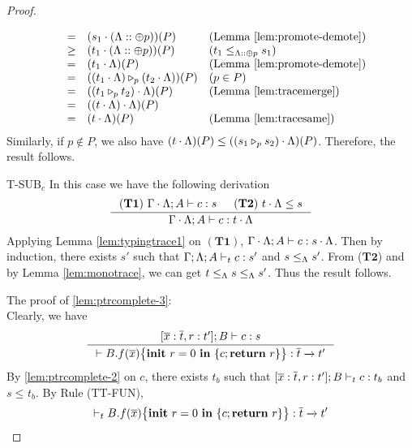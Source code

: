 {{{\begin{proof}
\begin{ProofEnumDesc}
$$\begin{array}{rlll}
&=&(s_1\cdot(\trace::\tplus{p}))(P) & (\textrm{Lemma \ref{lem:promote-demote}})\\
&\geq&(t_1\cdot(\trace::\tplus{p}))(P) & (t_1 \leq_{\trace::\tplus{p}} s_1)\\
& = & (t_1\cdot\trace)(P) &(\textrm{Lemma \ref{lem:promote-demote}})\\
& = & (\omerge{p}{(t_1\cdot\trace)}{(t_2\cdot\trace)})(P)&(p\in P)\\
& = & ((\omerge{p}{t_1}{t_2})\cdot\trace)(P)& (\textrm{Lemma \ref{lem:tracemerge}})\\
& = & ((t\cdot\trace)\cdot\trace)(P)&\\
& = & (t\cdot\trace)(P)& (\textrm{Lemma \ref{lem:tracesame}})\\
\end{array}
$$
Similarly, if $p\notin P$, we also have $(t \cdot \trace)(P)\leq ((\omerge{p}{s_1}{s_2})\cdot\trace)(P)$.
Therefore, the result follows.

\item[T-SUB$_c$] In this case we have the following derivation
\begin{equation*}
\inference
{(\mathbf{T1})~\Gamma\cdot\trace; A\vdash c : s & (\mathbf{T2})~ t\cdot\trace \leq s}
{\Gamma\cdot\trace; A\vdash c : t\cdot \trace}
\end{equation*}
Applying Lemma \ref{lem:typingtrace1} on $(\mathbf{T1})$, $\Gamma\cdot\trace; A\vdash c : s\cdot\trace$.
Then by induction, there exists $s'$ such that $\Gamma;\trace; A\vdash_{t} c : s'$ and $s \leq_{\trace} s' $.
From ($\mathbf{T2}$) and by Lemma \ref{lem:monotrace}, we can get $t\leq_{\trace} s\leq_{\trace} s'$.  Thus the result follows.

\end{ProofEnumDesc}
The proof of \ref{lem:ptrcomplete-3}: \\
Clearly, we have
\begin{equation*}
\inference
{
[\overline{x}: \overline{t}, \lpRES: t']; B \vdash c : s
}
{\vdash \lpPROG{B.f}{\overline{x}}{c}{\lpRES} :  \overline{t}\xrightarrow{} t'}
\end{equation*}
By \ref{lem:ptrcomplete-2} on $c$, there exists $t_b$ such that $[\overline{x}: \overline{t}, \lpRES: t']; B \vdash_{t} c : t_b$ and $s \leq_{} t_b $.
By Rule {(TT-FUN)},
$$\vdash_{t} \lpPROG{B.f}{\overline{x}}{c}{\lpRES} :  \overline{t}\xrightarrow{} t'$$
\end{proof}



}}}
